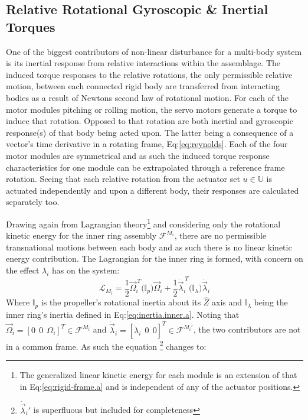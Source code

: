 \subsection{Relative Rotational Gyroscopic \& Inertial Torques}
\label{subsec:dynamics.nonlinearities.gyrotorques}
One of the biggest contributors of non-linear disturbance for a multi-body system is its inertial response from relative interactions within the assemblage. The induced torque responses to the relative rotations, the only permissible relative motion, between each connected rigid body are transferred from interacting bodies as a result of Newtons second law of rotational motion. For each of the motor modules pitching or rolling motion, the servo motors generate a torque to induce that rotation. Opposed to that rotation are both inertial and gyroscopic response(s) of that body being acted upon. The latter being a consequence of a vector's time derivative in a rotating frame, Eq:\ref{eq:reynolds}.
\newpage
Each of the four motor modules are symmetrical and as such the induced torque response characteristics for one module can be extrapolated through a reference frame rotation. Seeing that each relative rotation from the actuator set $u\in\mathbb{U}$ is actuated independently and upon a different body, their responses are calculated separately too.
\par
Drawing again from Lagrangian theory\footnote{The generalized linear kinetic energy for each module is an extension of that in Eq:\ref{eq:rigid-frame.a} and is independent of any of the actuator positions.} and considering only the rotational kinetic energy for the inner ring assembly $\mathcal{F}^{M_i}$, there are no permissible transnational motions between each body and as such there is no linear kinetic energy contribution. The Lagrangian for the inner ring is formed, with concern on the effect $\lambda_i$ has on the system:
\begin{equation}
\mathcal{L}_{M_i}=\frac{1}{2}\vec{\Omega}_i^{~T}\big(\mathbb{I}_{p}\big)\vec{\Omega}_i+\frac{1}{2}\dot{\vec{\lambda}}_i^{~T}\big(\mathbb{I}_{\lambda}\big)\dot{\vec{\lambda}}_i
\end{equation}
Where $\mathbb{I}_p$ is the propeller's rotational inertia about its $\hat{Z}$ axis and $\mathbb{I}_\lambda$ being the inner ring's inertia defined in Eq:\ref{eq:inertia.inner.a}. Noting that $\vec{\Omega}_i=[0~~0~~\Omega_i]^T\in\mathcal{F}^{M_i}$ and $\dot{\vec{\lambda}}_i=[\dot{\lambda}_i~~0~~0]^T\in\mathcal{F}^{M_i'}$, the two contributors are not in a common frame. As such the equation \footnote{$\dot{\vec{\lambda}}_i'$ is superfluous but included for completeness} changes to:

